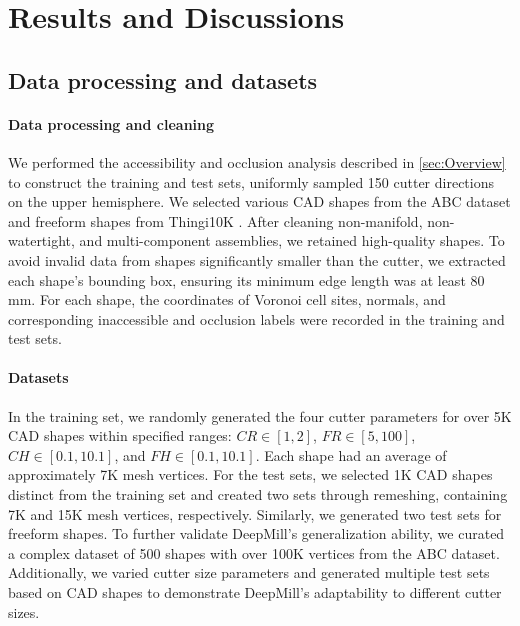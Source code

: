 \section{Results and Discussions}
\label{sec:results}

\subsection{Data processing and datasets}
\paragraph{Data processing and cleaning} 
We performed the accessibility and occlusion analysis described in \autoref{sec:Overview} to construct the training and test sets, uniformly sampled 150 cutter directions on the upper hemisphere. We selected various CAD shapes from the ABC dataset \cite{Koch2019CVPR} and freeform shapes from Thingi10K \cite{Thingi10K}. After cleaning non-manifold, non-watertight, and multi-component assemblies, we retained high-quality shapes. To avoid invalid data from shapes significantly smaller than the cutter, we extracted each shape's bounding box, ensuring its minimum edge length was at least 80 mm. For each shape, the coordinates of Voronoi cell sites, normals, and corresponding inaccessible and occlusion labels were recorded in the training and test sets.

\paragraph{Datasets}
In the training set, we randomly generated the four cutter parameters for over 5K CAD shapes within specified ranges: $CR \in [1, 2]$, $FR \in [5, 100]$, $CH \in [0.1, 10.1]$, and $FH \in [0.1, 10.1]$. Each shape had an average of approximately 7K mesh vertices. 
For the test sets, we selected 1K CAD shapes distinct from the training set and created two sets through remeshing, containing 7K and 15K mesh vertices, respectively. Similarly, we generated two test sets for freeform shapes. 
To further validate DeepMill's generalization ability, we curated a complex dataset of 500 shapes with over 100K vertices from the ABC dataset. Additionally, we varied cutter size parameters and generated multiple test sets based on CAD shapes to demonstrate DeepMill's adaptability to different cutter sizes.

